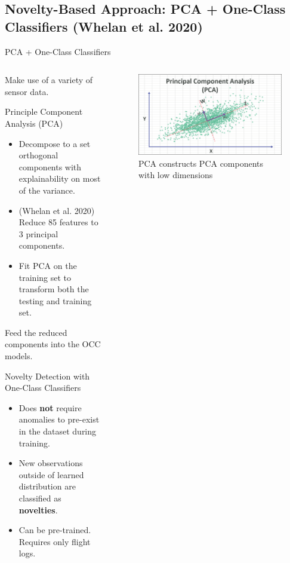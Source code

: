 \documentclass[aspectratio=169, 8pt]{beamer}
\begin{document}
\subsection{Novelty-Based Approach: PCA + One-Class Classifiers (Whelan et al. 2020)}
\begin{frame}{PCA + One-Class Classifiers}


\begin{columns}[T]
    {\small
    \begin{column}{0.5\linewidth}
        
        Make use of a variety of sensor data.
    
        \begin{block}{Principle Component Analysis (PCA)}
            \begin{itemize}
                \item  Decompose to a set orthogonal components with explainability on most of the variance.
                \item  (Whelan et al. 2020) Reduce 85 features to 3 principal components.
                \item Fit PCA on the training set to  transform both the testing and training set.
            \end{itemize}
        \end{block}

        Feed the reduced components into the OCC models.
        \begin{block}{Novelty Detection with One-Class Classifiers}
            \begin{itemize}
                \item Does \textbf{not} require anomalies to pre-exist in the dataset during training.
                \item New observations outside of learned distribution are classified as \textbf{novelties}.
                \item Can be pre-trained. Requires only flight logs.
            \end{itemize}
        \end{block}
    \end{column}
    
    \begin{column}{0.5\linewidth}
        \begin{figure}
            \centering
            \includegraphics[width = 0.5 \textwidth]{images/principal-component-analysis-pca-featured.png}
            \caption{PCA constructs PCA components with low dimensions}
            \label{fig:pca-1}
        \end{figure}


\end{column}}
\end{columns}
\end{frame}
\end{document}
